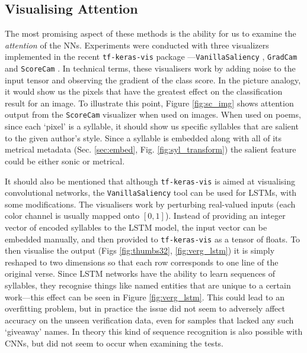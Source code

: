\documentclass[
    twocolumn,
    hf,
]{ceurart}
\begin{document}
\subsection{Visualising Attention}

The most promising aspect of these methods is the ability for us to examine the
\emph{attention} of the NNs. Experiments were conducted with three visualizers
implemented in the recent \texttt{tf-keras-vis} package
\cite{Kubota_tf-keras-vis_2021}---\texttt{VanillaSaliency}
\cite{vanilla_saliency}, \texttt{GradCam} \cite{gradcam} and
\texttt{ScoreCam} \cite{scorecam}. In technical terms, these
visualisers work by adding noise to the input tensor and observing the gradient
of the class score. In the picture analogy, it would show us the pixels that
have the greatest effect on the classification result for an image. To
illustrate this point, Figure \ref{fig:sc_img} shows attention output from the
\texttt{ScoreCam} visualizer when used on images. When used on
poems, since each `pixel' is a syllable, it should show us specific syllables
that are salient to the given author's style. Since a syllable is embedded along
with all of its metrical metadata (Sec. \ref{sec:embed}, Fig.
\ref{fig:syl_transform}) the salient feature could be either sonic or metrical.

It should also be mentioned that although \texttt{tf-keras-vis} is
aimed at visualising convolutional networks, the
\texttt{VanillaSaliency} tool can be used for LSTMs, with some
modifications. The visualisers work by perturbing real-valued inputs (each color
channel is usually mapped onto $[0,1]$). Instead of providing an integer vector
of encoded syllables to the LSTM model, the input vector can be embedded
manually, and then provided to \texttt{tf-keras-vis} as a tensor of
floats. To then visualise the output (Figs \ref{fig:thumbs32},
\ref{fig:verg_lstm}) it is simply reshaped to two dimensions so that each row
corresponds to one line of the original verse. Since LSTM networks have the
ability to learn sequences of syllables, they recognise things like named
entities that are unique to a certain work---this effect can be seen in Figure
\ref{fig:verg_lstm}. This could lead to an overfitting problem, but in
practice the issue did not seem to adversely affect accuracy on the unseen
verification data, even for samples that lacked any such `giveaway' names. In
theory this kind of sequence recognition is also possible with CNNs, but did not
seem to occur when examining the tests.
\end{document}
